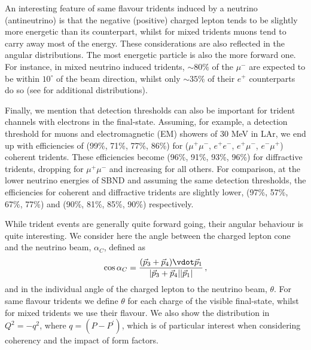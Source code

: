 An interesting feature of same flavour tridents induced by a neutrino (antineutrino) is that the negative (positive) charged lepton tends to be slightly more energetic than its counterpart, whilst for mixed tridents muons tend to carry away most of the energy. These considerations are also reflected in the angular distributions. The most energetic particle is also the more forward one. For instance, in mixed neutrino induced tridents, $\sim 80 \%$ of the $\mu^-$ are expected to be within $10^\circ$ of the beam direction, whilst only $\sim 35 \%$ of their $e^+$ counterparts do so (see  for additional distributions).

Finally, we mention that detection thresholds can also be important for trident channels with electrons in the final-state. Assuming, for example, a detection threshold for muons and electromagnetic (EM) showers of 30 MeV in LAr, we end up with efficiencies of (99\%, 71\%, 77\%, 86\%) for ($\mu^+ \mu^-$, $e^+ e^-$, $e^+ \mu^-$, $e^- \mu^+$) coherent tridents. These efficiencies become (96\%, 91\%, 93\%, 96\%) for diffractive tridents, dropping for $\mu^+\mu^-$ and increasing for all others. For comparison, at the lower neutrino energies of SBND and assuming the same detection thresholds, the efficiencies for coherent and diffractive tridents are slightly lower, (97\%, 57\%, 67\%, 77\%) and (90\%, 81\%, 85\%, 90\%) respectively.

While trident events are generally quite forward going, their angular behaviour is quite interesting. We consider here the angle between the charged lepton cone and the neutrino beam, $\alpha_C$, defined as 
%
\[
\cos{\alpha_C} = \frac{ (\vec{p}_3 + \vec{p}_4)  \vdot \vec{p}_1}{ |\vec{p}_3 + \vec{p}_4| |\vec{p}_1| }\, ,\]  
%
and in the individual angle of the charged lepton to the neutrino beam, $\theta$. For same flavour tridents we define $\theta$ for each charge of the visible final-state, whilst for mixed tridents we use their flavour. We also show the distribution in $Q^2 = {-q^2}$, where $q = (P - P^\prime)$, which is of particular interest when considering coherency and the impact of form factors.

